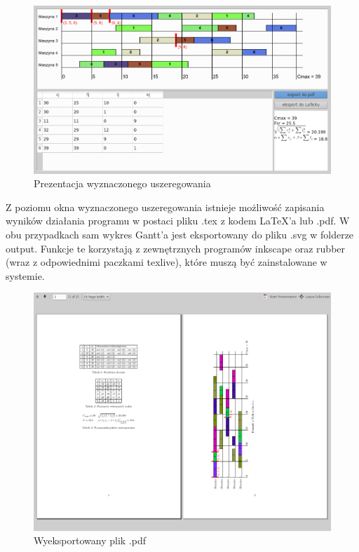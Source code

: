 \documentclass[twoside]{kInzynierka}
\begin{document}
\begin{figure}[htb]
    \centering
    \includegraphics[width=\textwidth, keepaspectratio=true]{./obrazki/wykres}
    \caption{Prezentacja wyznaczonego uszeregowania}
\end{figure}

Z poziomu okna wyznaczonego uszeregowania istnieje możliwość zapisania wyników działania programu w postaci pliku .tex z kodem \LaTeX{}'a lub .pdf. W obu przypadkach sam wykres Gantt'a jest eksportowany do pliku .svg w folderze output. Funkcje te korzystają z zewnętrznych programów inkscape oraz rubber (wraz z odpowiednimi paczkami texlive), które muszą być zainstalowane w systemie. 

\begin{figure}[htb]
    \centering
    \includegraphics[width=\textwidth, keepaspectratio=true]{./obrazki/pdf}
    \caption{Wyeksportowany plik .pdf}
\end{figure}
\end{document}
